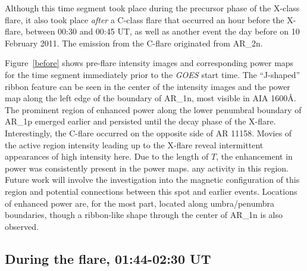 
Although this time segment took place during the precursor phase
of the X-class flare, it also took place
\emph{after} a C-class flare that occurred an hour before the X-flare,
between 00:30 and 00:45 UT,
as well as another event the day before on 10 February 2011.
The emission from the C-flare originated from AR\_2n.

Figure~\ref{before}
shows pre-flare intensity images and corresponding power maps for
the time segment immediately prior to the \textit{GOES}
start time.
The ``J-shaped'' ribbon feature can be seen in the center of the
intensity images and the power map
along the left
edge of the boundary of AR\_1n,
most visible in AIA 1600\AA{}.
The prominent region of enhanced power along the lower penumbral
boundary of AR\_1p
emerged earlier and persisted until the decay phase of the X-flare.
Interestingly, the C-flare occurred on the opposite side of
AR 11158.
Movies of the active region intensity leading up to the X-flare reveal
intermittent appearances of high intensity here. Due to the length
of $T$, the enhancement in power was consistently present in the power maps.
any activity in this region.
Future work will involve the investigation into
the magnetic configuration of this region and
potential connections between this spot and earlier events.
Locations of enhanced power are, for the most part, located along
umbra/penumbra boundaries, though a ribbon-like shape through the
center of AR\_1n is also observed.


\subsection{During the flare, 01:44-02:30 UT}



